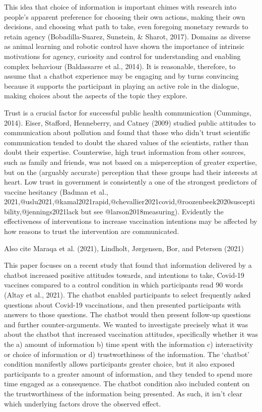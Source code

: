 \documentclass[english,,jou,floatsintext]{apa6}
\begin{document}
This idea that choice of information is important chimes with research into people's apparent preference for choosing their own actions, making their own decisions, and choosing what path to take, even foregoing monetary rewards to retain agency (Bobadilla-Suarez, Sunstein, \& Sharot, 2017). Domains as diverse as animal learning and robotic control have shown the importance of intrinsic motivations for agency, curiosity and control for understanding and enabling complex behaviour (Baldassarre et al., 2014). It is reasonable, therefore, to assume that a chatbot experience may be engaging and by turns convincing because it supports the participant in playing an active role in the dialogue, making choices about the aspects of the topic they explore.

Trust is a crucial factor for successful public health communication (Cummings, 2014). Eiser, Stafford, Henneberry, and Catney (2009) studied public attitudes to communication about pollution and found that those who didn't trust scientific communication tended to doubt the shared values of the scientists, rather than doubt their expertise. Counterwise, high trust information from other sources, such as family and friends, was not based on a misperception of greater expertise, but on the (arguably accurate) perception that these groups had their interests at heart. Low trust in government is consistently a one of the strongest predictors of vaccine hesitancy (Badman et al., 2021,@uslu2021,@kamal2021rapid,@chevallier2021covid,@roozenbeek2020susceptibility,@jennings2021lack but see @larson2018measuring). Evidently the effectiveness of interventions to increase vaccination intentions may be affected by how reasons to trust the intervention are communicated.

Also cite Maraqa et al. (2021), Lindholt, Jørgensen, Bor, and Petersen (2021)

This paper focuses on a recent study that found that information delivered by a chatbot increased positive attitudes towards, and intentions to take, Covid-19 vaccines compared to a control condition in which participants read 90 words (Altay et al., 2021). The chatbot enabled participants to select frequently asked questions about Covid-19 vaccinations, and then presented participants with answers to those questions. The chatbot would then present follow-up questions and further counter-arguments. We wanted to investigate precisely what it was about the chatbot that increased vaccination attitudes, specifically whether it was the a) amount of information b) time spent with the information c) interactivity or choice of information or d) trustworthiness of the information. The `chatbot' condition manifestly allows participants greater choice, but it also exposed participants to a greater amount of information, and they tended to spend more time engaged as a consequence. The chatbot condition also included content on the trustworthiness of the information being presented. As such, it isn't clear which underlying factors drove the observed effect.
\end{document}
